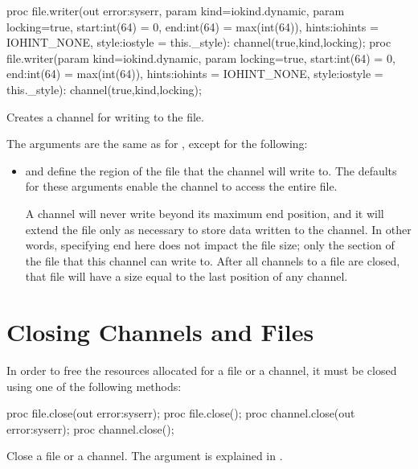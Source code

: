 \begin{protohead}
proc file.writer(out error:syserr, param kind=iokind.dynamic, param locking=true,
                 start:int(64) = 0, end:int(64) = max(int(64)), hints:iohints = IOHINT_NONE,
                 style:iostyle = this._style): channel(true,kind,locking);
proc file.writer(param kind=iokind.dynamic, param locking=true,
                 start:int(64) = 0, end:int(64) = max(int(64)), hints:iohints = IOHINT_NONE,
                 style:iostyle = this._style): channel(true,kind,locking);
\end{protohead}
\begin{protobody}
Creates a channel for writing to the file.

The arguments are the same as for , except for the following:

\begin{itemize}

\item {} and  define the region of the file that
      the channel will write to. The defaults for these arguments enable
      the channel to access the entire file.

      A channel will never write beyond its maximum end position,
      and it will extend the file only as necessary to store data
      written to the channel. In other words, specifying end here
      does not impact the file size; only the section of the file
      that this channel can write to. After all channels to a file
      are closed, that file will have a size equal to the last
      position of any channel.

\end{itemize}

\end{protobody}


\section{Closing Channels and Files}
\label{IO_closing_files_channels}

In order to free the resources allocated for a file or a channel, it
must be closed using one of the following methods:

\begin{protohead}
proc file.close(out error:syserr);
proc file.close();
proc channel.close(out error:syserr);
proc channel.close();
\end{protohead}
\begin{protobody}
Close a file or a channel.
The  argument is explained in .
\end{protobody}

